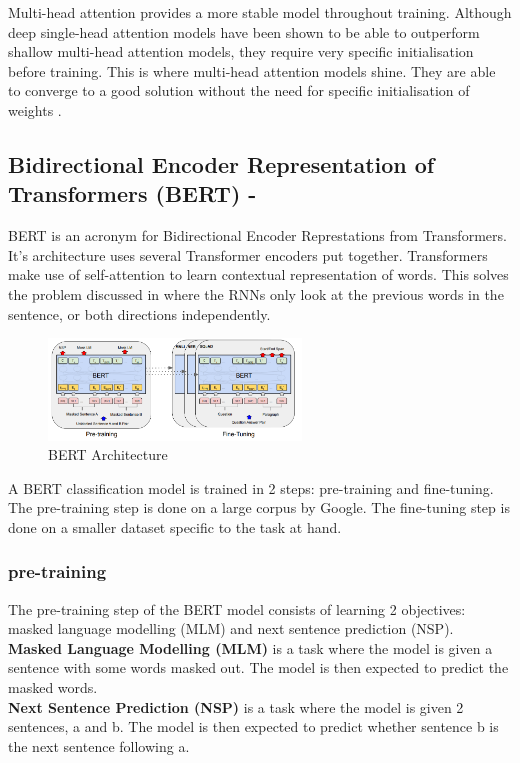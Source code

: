 Multi-head attention provides a more stable model throughout training. Although deep single-head attention models have been shown
to be able to outperform shallow multi-head attention models, they require very specific initialisation before training. This is where
multi-head attention models shine. They are able to converge to a good solution without the need for specific initialisation of weights \cite{multi-head-pros}.
\subsection{Bidirectional Encoder Representation of Transformers (BERT) - \cite{BERT}}
BERT is an acronym for Bidirectional Encoder Represtations from Transformers. It's architecture uses several Transformer encoders
put together. Transformers make use of self-attention to learn contextual representation of words. This solves the problem
discussed in  where the RNNs only look at the previous words in the sentence, or both directions independently.
\begin{figure}[hbtp]
    \centering
    \includegraphics[width=0.6\textwidth]{../images/bert.png}
    \caption{BERT Architecture}
    \label{fig:bert}
\end{figure}

A BERT classification model is trained in 2 steps: pre-training and fine-tuning. The pre-training step is done on a large corpus
by Google. The fine-tuning step is done on a smaller dataset specific to the task at hand.

\subsubsection{pre-training}
The pre-training step of the BERT model consists of learning 2 objectives: masked language modelling (MLM) and next sentence prediction
(NSP).\\
\textbf{Masked Language Modelling (MLM)} is a task where the model is given a sentence with some words masked out. The model is then
expected to predict the masked words.\\
\textbf{Next Sentence Prediction (NSP)} is a task where the model is given 2 sentences, a and b. The model is then expected to predict
whether sentence b is the next sentence following a.\\\\

